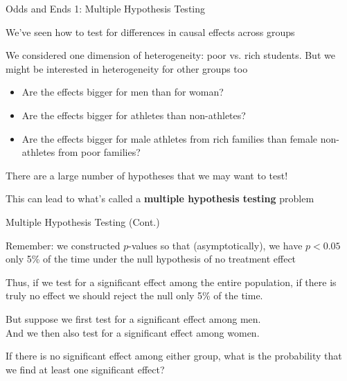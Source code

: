 \documentclass[11pt,english,handout]{beamer}
\newenvironment{wideitemize}{\itemize\addtolength{\itemsep}{10pt}}{\enditemize}
\begin{document}
\begin{frame}{Odds and Ends 1: Multiple Hypothesis Testing}
	\begin{wideitemize}
		\item
		We've seen how to test for differences in causal effects across groups
		
		\pause
		\item
		We considered one dimension of heterogeneity: poor vs. rich students. But we might be interested in heterogeneity for other groups too\smallskip
			\begin{itemize}
				\item
				Are the effects bigger for men than for woman? \smallskip
				
				\pause
				\item
				Are the effects bigger for athletes than non-athletes? \smallskip
				
				\pause
				\item
				Are the effects bigger for male athletes from rich families than female non-athletes from poor families? 	
		   \end{itemize}
	   
	  \pause
	  \item
	  There are a large number of hypotheses that we may want to test! 	
	  
	  \pause
	  \item
	  This can lead to what's called a \textbf{multiple hypothesis testing} problem
	\end{wideitemize}	
\end{frame}


\begin{frame}{Multiple Hypothesis Testing (Cont.)}
	\begin{wideitemize}
		\item
		Remember: we constructed $p$-values so that (asymptotically), we have $p<0.05$ only 5\% of the time under the null hypothesis of no treatment effect
		
		\pause
		\item
		Thus, if we test for a significant effect among the entire population, if there is truly no effect we should reject the null only 5\% of the time. 
		
		\pause
		\item
		But suppose we first test for a significant effect among men. \\
		And we then also test for a significant effect among women. 
		
		\pause
		\item
		If there is no significant effect among either group, what is the probability that we find at least one significant effect? 

	\end{wideitemize}
\end{frame}
\end{document}
